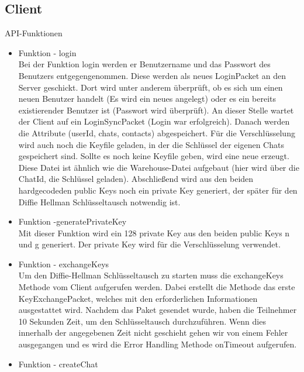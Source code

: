 \subsection{Client}
API-Funktionen
\begin{itemize}
    \item Funktion - login\\
    Bei der Funktion login werden er Benutzername und das Passwort des Benutzers entgegengenommen. Diese werden als neues LoginPacket an den Server geschickt. Dort wird unter anderem überprüft, ob es sich um einen neuen Benutzer handelt (Es wird ein neues angelegt) oder es ein bereits existierender Benutzer ist (Passwort wird überprüft). An dieser Stelle wartet der Client auf ein LoginSyncPacket (Login war erfolgreich). Danach werden die Attribute (userId, chats, contacts) abgespeichert. Für die Verschlüsselung wird auch noch die Keyfile geladen, in der die Schlüssel der eigenen Chats gespeichert sind. Sollte es noch keine Keyfile geben, wird eine neue erzeugt. Diese Datei ist ähnlich wie die Warehouse-Datei aufgebaut (hier wird über die ChatId, die Schlüssel geladen). Abschließend wird aus den beiden hardgecodeden public Keys noch ein private Key generiert, der später für den    Diffie Hellman Schlüsseltausch notwendig ist.
    
    \item Funktion -generatePrivateKey\\
    Mit dieser Funktion wird ein 128 private Key aus den beiden public Keys n und g generiert. Der private Key wird für die Verschlüsselung verwendet.
    
    \item Funktion - exchangeKeys\\
    Um den Diffie-Hellman Schlüsseltausch zu starten muss die exchangeKeys Methode vom Client aufgerufen werden.
    Dabei erstellt die Methode das erste KeyExchangePacket, welches mit den erforderlichen Informationen
    ausgestattet wird. Nachdem das Paket gesendet wurde, haben die Teilnehmer 10 Sekunden Zeit, um den Schlüsseltausch durchzuführen. Wenn dies innerhalb der angegebenen Zeit nicht geschieht gehen wir von einem Fehler ausgegangen und es wird die Error Handling Methode onTimeout aufgerufen.
    
    \item Funktion - createChat\\

\end{itemize}
